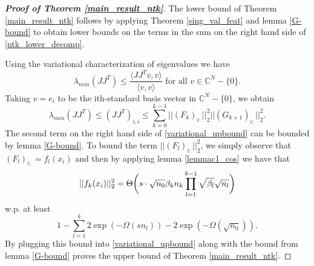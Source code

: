 \documentclass{article}
\theoremstyle{plain}
\theoremstyle{definition}
\theoremstyle{remark}
\newcommand\C{\mathbb{C}}
\begin{document}
\begin{proof}[\textbf{Proof of Theorem \ref{main_result_ntk}}]
The lower bound of Theorem \ref{main_result_ntk} follows by applying Theorem \ref{sing_val_feat} and lemma \ref{G-bound} to obtain lower bounds on the terms in the sum on the right hand side of \eqref{ntk_lower_decomp}.

    Using the variational characterization of eigenvalues we have
    \begin{equation*}
        \lambda_{min}(JJ^T) \leq \frac{\langle JJ^Tv, v\rangle}
        {\langle v, v\rangle} \text{ for all } v \in \C^N-\{0\}.
    \end{equation*}
Taking $v = e_i$ to be the ith-standard basis vector in $\C^N-\{0\}$, we obtain
\begin{equation}\label{variational_upbound}
    \lambda_{min}(JJ^T) \leq (JJ^T)_{i,i} \leq 
    \sum_{k=0}^{L-1}\vert\vert(F_k)_{i:}\vert\vert_2^2\vert\vert 
    (G_{k+1})_{i:}\vert\vert^2_2.
\end{equation}
The second term on the right hand side of \eqref{variational_upbound} can be bounded 
by lemma \ref{G-bound}. To bound the term $\vert\vert(F_l)_{i:}\vert\vert_2^2$, we simply observe that $(F_l)_{i:} = f_l(x_i)$ and then by applying lemma \ref{lemmac1_cos}
we have that 
\begin{equation*}
    \vert\vert f_k(x_i)\vert\vert^2_2 = 
    \Theta\bigg{(}s\cdot \sqrt{n_0}\beta_k n_k
	\prod_{l=1}^{k-1}\sqrt{\beta_l}\sqrt{n_l}\bigg{)}
\end{equation*}
w.p. at least
\begin{equation*}
    1 - \sum_{l=1}^k2\exp(-\Omega(sn_l)) - 2\exp(-\Omega(\sqrt{n_0})).
\end{equation*}
By plugging this bound into \eqref{variational_upbound} along with the bound from 
lemma \ref{G-bound} proves the upper bound of Theorem \ref{main_result_ntk}.
\end{proof}


\end{document}
